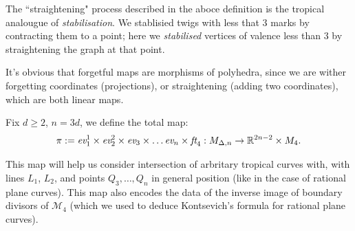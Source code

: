 \begin{remark}
    The ``straightening" process described in the aboce definition is the tropical analougue of \textit{stabilisation}. 
    We stablisied twigs with less that $3$ marks by contracting them to a point; here we \textit{stabilised} vertices of valence less than $3$ by straightening the graph at that point. 
\end{remark}

\begin{remark}
    It's obvious that forgetful maps are morphisms of polyhedra, since we are wither forgetting coordinates (projections), or straightening (adding two coordinates), which are both linear maps. 
\end{remark}

\begin{definition}
    Fix $d\geq 2$, $n =3d$, we define the total map:
    \begin{align*}
        \pi:= \emph{ev}^{1}_{1} \times\emph{ev}^{2}_{2} \times\emph{ev}_{3} \times \dots \emph{ev}_{n} \times \emph{ft}_{4}: M_{\Delta, n} \to \mathbb{R}^{2n-2} \times M_{4}.
    \end{align*}
\end{definition}
This map will help us consider intersection of arbritary tropical curves with, with lines $L_{1}$, $L_{2}$, and points $Q_{3}, \dots, Q_{n}$ in general position (like in the case of rational plane curves). 
This map also encodes the data of the inverse image of boundary divisors of $\mathcal{M}_{4}$ (which we used to deduce Kontsevich's formula for rational plane curves).

